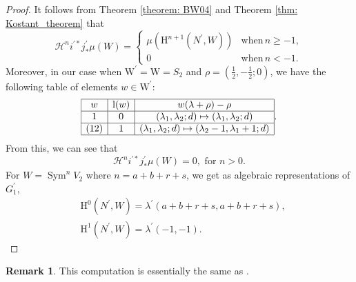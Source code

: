 \documentclass[11pt, a4paper]{amsart}
\theoremstyle{plain}
\theoremstyle{definition}
\newtheorem{remark}[theorem]{Remark}
\numberwithin{equation}{section}
\DeclareMathOperator{\Sym}{Sym}
\begin{document}
\begin{proof}
    It follows from Theorem \ref{theorem: BW04} and Theorem \ref{thm: Kostant_theorem} that 
    \begin{equation*}
        \mathcal{H}^{n}i^{\prime*}j_{*}^{\prime}\mu(W) =  \begin{cases}
                                                \mu(\mathrm{H}^{n + 1}(N^{\prime}, W)) & \text{when} \, n \ge -1, \\ 
                                                0 & \text{when} \, n < -1.
                                           \end{cases} 
    \end{equation*}
    Moreover, in our case when $\mathrm{W}^{\prime} = \mathrm{W} = S_{2}$ and $\rho = (\frac{1}{2}, -\frac{1}{2}; 0)$, we have the following table of elements $w \in \mathrm{W}^{\prime}$:
    \[
        \begin{array}{|c|c|c|}
           \hline w  & \mathrm{l}(w) & w(\lambda + \rho) - \rho \\
           \hline 1 & 0 & (\lambda_1, \lambda_2; d) \mapsto (\lambda_1, \lambda_2; d) \\
           \hline (12) & 1 & (\lambda_1, \lambda_2; d) \mapsto (\lambda_2 - 1, \lambda_1 + 1; d) \\
           \hline
        \end{array}. 
    \]
    From this,  we can see that 
     \begin{equation*}
        \mathcal{H}^{n}i^{\prime*}j_{*}^{\prime}\mu(W) = 0, \, \, \text{for} \,\,  n > 0. 
    \end{equation*}
    For $W = \Sym^{n}V_{2}$ where $n = a + b + r + s$, we get as algebraic representations of $G_1^{\prime}$, 
    \begin{align*}
       & \mathrm{H}^{0}(N^{\prime}, W) = \lambda^{\prime}(a + b + r + s, a + b + r + s), \\
       & \mathrm{H}^{1}(N^{\prime}, W) = \lambda^{\prime}(-1, -1).
    \end{align*}
\end{proof}

\begin{remark}
    This computation is essentially the same as \cite[Lemma 4.4]{LemmaI15}. 
\end{remark}
\end{document}
